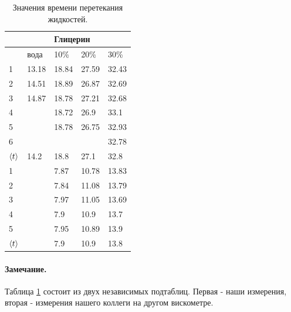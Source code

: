 \documentclass[a4paper,12pt]{article}
\numberwithin{equation}{section}
\begin{document}
\begin{enumerate}
        \begin{table} [H]
          \center
          \begin{tabular}{|l|l|l|l|l|}
            \hline
                       &       & \multicolumn{2}{l}{Глицерин} &               \\
            \hline
                       & вода  & 10\%                         & 20\%  & 30\%  \\
            \hline
            1          & 13.18 & 18.84                        & 27.59 & 32.43 \\
            2          & 14.51 & 18.89                        & 26.87 & 32.69 \\
            3          & 14.87 & 18.78                        & 27.21 & 32.68 \\
            4          &       & 18.72                        & 26.9  & 33.1  \\
            5          &       & 18.78                        & 26.75 & 32.93 \\
            6          &       &                              &       & 32.78 \\
            \hline
            $\left< t \right>$ & 14.2  & 18.8                         & 27.1  & 32.8  \\
            \hline
            \hline
            1          &       & 7.87                         & 10.78 & 13.83 \\
            2          &       & 7.84                         & 11.08 & 13.79 \\
            3          &       & 7.97                         & 11.05 & 13.69 \\
            4          &       & 7.9                          & 10.9  & 13.7  \\
            5          &       & 7.95                         & 10.89 & 13.9  \\
            \hline
            $\left< t \right>$ &       & 7.9                          & 10.9  & 13.8  \\
            \hline
          \end{tabular}
          \caption{Значения времени перетекания жидкостей. \label{table:2}}
        \end{table}

        \paragraph{Замечание.}
        Таблица \ref{table:2} состоит из двух независимых подтаблиц. Первая - наши измерения, вторая - измерения нашего коллеги на другом вискометре.\\


\end{enumerate}
\end{document}
